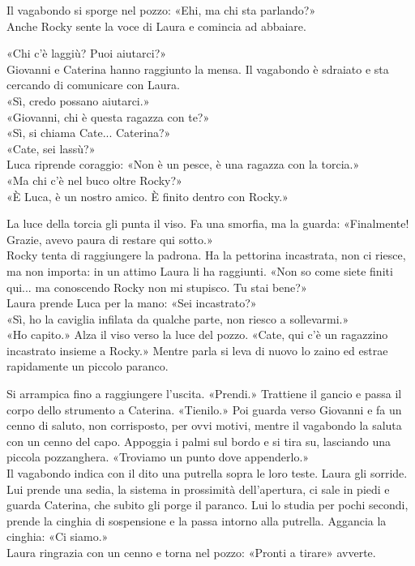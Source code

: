 \separatore

\par\medskip
Il vagabondo si sporge nel pozzo: «Ehi, ma chi sta parlando?»\\
Anche Rocky sente la voce di Laura e comincia ad abbaiare.

\par\medskip
«Chi c’\`e laggiù? Puoi aiutarci?»\\
Giovanni e Caterina hanno raggiunto la mensa. Il vagabondo \`e sdraiato e sta cercando di comunicare con Laura.\\
«Sì, credo possano aiutarci.»\\
«Giovanni, chi \`e questa ragazza con te?»\\
«Sì, si chiama Cate...  Caterina?»\\
«Cate, sei lassù?»\\
Luca riprende coraggio:
«Non \`e un pesce, \`e una ragazza con la torcia.»\\
«Ma chi c’\`e nel buco oltre Rocky?»\\
«\`E Luca, \`e un nostro amico. \`E finito dentro con Rocky.»

\par\medskip
La luce della torcia gli punta il viso. Fa una smorfia, ma la guarda: «Finalmente! Grazie, avevo paura di restare qui sotto.»\\
Rocky tenta di raggiungere la padrona. Ha la pettorina incastrata, non ci riesce, ma non importa: in un attimo Laura li ha raggiunti.
«Non so come siete finiti qui... ma conoscendo Rocky non mi stupisco. Tu stai bene?»\\
Laura prende Luca per la mano: «Sei incastrato?»\\
«Sì, ho la caviglia infilata da qualche parte, non riesco a sollevarmi.»\\
«Ho capito.» Alza il viso verso la luce del pozzo. «Cate, qui c’\`e un ragazzino incastrato insieme a Rocky.» Mentre parla si leva di nuovo lo zaino ed estrae rapidamente un piccolo paranco.
\par\medskip
Si arrampica fino a raggiungere l’uscita. «Prendi.» Trattiene il gancio e passa il corpo dello strumento a Caterina. «Tienilo.» Poi guarda verso Giovanni e fa un cenno di saluto, non corrisposto, per ovvi motivi, mentre il vagabondo la saluta con un cenno  del capo. Appoggia i palmi sul bordo e si tira su, lasciando una piccola pozzanghera. «Troviamo un punto dove appenderlo.»\\
Il vagabondo indica con il dito una putrella sopra le loro teste. Laura gli sorride. Lui prende una sedia, la sistema in prossimità dell’apertura, ci sale in piedi e guarda Caterina, che subito gli porge il paranco. Lui lo studia per pochi secondi, prende la cinghia di sospensione e la passa intorno alla putrella. Aggancia la cinghia: «Ci siamo.»\\
Laura ringrazia con un cenno e torna nel pozzo: «Pronti a tirare» avverte.

